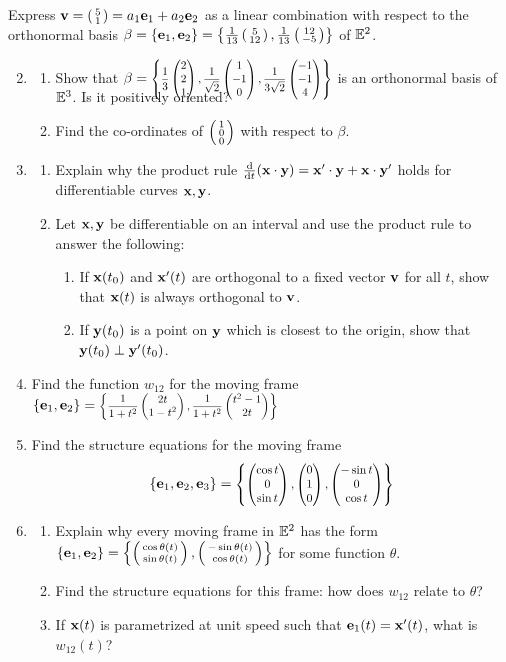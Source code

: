 \begin{exercises}
\exstart Express ${\mathbf{v}}=\left(\begin{smallmatrix}5\\1\end{smallmatrix}\right)=a_1{\mathbf{e}}_1+a_2{\mathbf{e}}_2$ as a linear combination with respect to the orthonormal basis $\beta=\{{\mathbf{e}}_1,{\mathbf{e}}_2\}=\left\{\frac 1{13}\left(\begin{smallmatrix}5\\12\end{smallmatrix}\right),\frac 1{13}\left(\begin{smallmatrix}12\\-5\end{smallmatrix}\right)\right\}$ of $\mathbb{E}^2$.

\begin{enumerate}\setcounter{enumi}{1}
  \item\begin{enumerate}
    \item Show that $\beta=\smash[b]{\scalebox{0.8}{$\left\{\dfrac 13\threevec 221,\dfrac 1{\sqrt 2}\threevec 1{-1}0,\dfrac 1{3\sqrt 2}\threevec{-1}{-1}4\right\}$}}$ is an orthonormal basis of $\mathbb{E}^3$. Is it positively oriented?
    \item Find the co-ordinates of $\smash[t]{\left(\begin{smallmatrix}1\\0\\0\end{smallmatrix}\right)}$ with respect to $\beta$.
  \end{enumerate}
  
  \item\begin{enumerate}
		\item Explain why the product rule $\frac{\mathrm{d} }{\mathrm{d} t}({\mathbf{x}}\cdot{\mathbf{y}})={\mathbf{x}}'\cdot{\mathbf{y}}+{\mathbf{x}}\cdot{\mathbf{y}}'$ holds for differentiable curves ${\mathbf{x}},{\mathbf{y}}$.    
		\item Let ${\mathbf{x}},{\mathbf{y}}$ be differentiable on an interval and use the product rule to answer the following:
		\begin{enumerate}
		  \item If ${\mathbf{x}}(t_0)$ and ${\mathbf{x}}'(t)$ are orthogonal to a fixed vector ${\mathbf{v}}$ for all $t$, show that ${\mathbf{x}}(t)$ is always orthogonal to ${\mathbf{v}}$.
			\item If ${\mathbf{y}}(t_0)$ is a point on ${\mathbf{y}}$ which is closest to the origin, show that ${\mathbf{y}}(t_0)\perp{\mathbf{y}}'(t_0)$.
		\end{enumerate}
	\end{enumerate}
  
  \item Find the function $w_{12}$ for the moving frame $\{\ve_1,\ve_2\}=\scalebox{0.8}{$\left\{\dfrac 1{1+t^2}\twovec{2t}{1-t^2},\dfrac 1{1+t^2}\twovec{t^2-1}{2t}\right\}$}$
  
 	\item Find the structure equations for the moving frame
 	\[\{\ve_1,\ve_2,\ve_3\}=\scalebox{0.85}{$\left\{\threevec{\cos t}0{\sin t}, \threevec 010, \threevec{-\sin t}{0}{\cos t}\right\}$}\]
  
  \item\begin{enumerate}
    \item Explain why every moving frame in $\mathbb{E}^2$ has the form $\{{\mathbf{e}}_1,{\mathbf{e}}_2\}=\left\{\left(\begin{smallmatrix}\cos \theta(t)\\\sin \theta(t)\end{smallmatrix}\right),\left(\begin{smallmatrix}-\sin\theta(t)\\\cos \theta(t)\end{smallmatrix}\right)\right\}$ for some function $\theta$.
    \item Find the structure equations for this frame: how does $w_{12}$ relate to $\theta$?
    \item\label{exs:frenet2deasy} If ${\mathbf{x}}(t)$ is parametrized at unit speed such that ${\mathbf{e}}_1(t)={\mathbf{x}}'(t)$, what is $w_{12}(t)$?
  \end{enumerate}
  

\end{enumerate}
\end{exercises}
